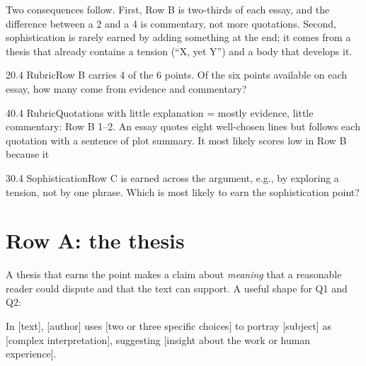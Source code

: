 \documentclass[11pt]{article}
\begin{document}
Two consequences follow. First, Row B is two-thirds of each essay, and the difference between a 2 and a 4 is commentary, not more quotations. Second, sophistication is rarely earned by adding something at the end; it comes from a thesis that already contains a tension (``X, yet Y'') and a body that develops it.

\begin{q}{2}{0.4 Rubric}{Row B carries 4 of the 6 points.}
Of the six points available on each essay, how many come from evidence and commentary?
\end{q}

\begin{q}{4}{0.4 Rubric}{Quotations with little explanation = mostly evidence, little commentary: Row B 1--2.}
An essay quotes eight well-chosen lines but follows each quotation with a sentence of plot summary. It most likely scores low in Row B because it
\end{q}

\begin{q}{3}{0.4 Sophistication}{Row C is earned across the argument, e.g., by exploring a tension, not by one phrase.}
Which is most likely to earn the sophistication point?
\end{q}

\section{Row A: the thesis}
\label{sec:5}

A thesis that earns the point makes a claim about \emph{meaning} that a reasonable reader could dispute and that the text can support. A useful shape for Q1 and Q2:

\begin{keyidea}
In [text], [author] uses [two or three specific choices] to portray [subject] as [complex interpretation], suggesting [insight about the work or human experience].
\end{keyidea}
\end{document}
